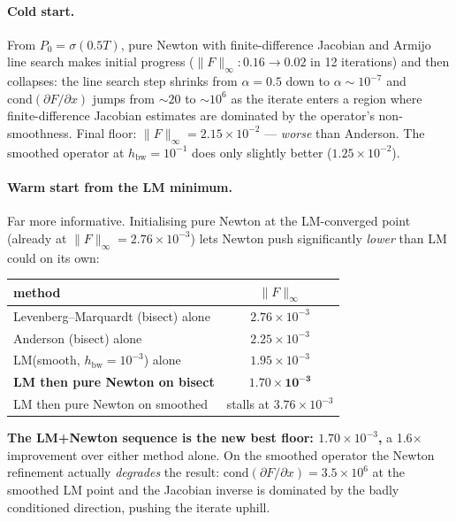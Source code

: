 \documentclass[11pt]{article}
\begin{document}
\paragraph{Cold start.} From $P_0 = \sigma(0.5 T)$, pure Newton with
finite-difference Jacobian and Armijo line search makes initial progress
($\|F\|_\infty\!:\! 0.16 \to 0.02$ in 12 iterations) and then collapses:
the line search step shrinks from $\alpha=0.5$ down to $\alpha\sim 10^{-7}$
and $\mathrm{cond}(\partial F/\partial x)$ jumps from $\sim 20$ to $\sim 10^6$
as the iterate enters a region where finite-difference Jacobian estimates
are dominated by the operator's non-smoothness. Final floor:
$\|F\|_\infty = 2.15\!\times\!10^{-2}$ --- \emph{worse} than Anderson.
The smoothed operator at $h_{\mathrm{bw}}=10^{-1}$ does only slightly
better ($1.25\!\times\!10^{-2}$).

\paragraph{Warm start from the LM minimum.} Far more informative.
Initialising pure Newton at the LM-converged point (already at
$\|F\|_\infty = 2.76\!\times\!10^{-3}$) lets Newton push significantly
\emph{lower} than LM could on its own:

\begin{center}
\begin{tabular}{lc}
\toprule
method & $\|F\|_\infty$ \\
\midrule
Levenberg--Marquardt (bisect) alone           & $2.76\!\times\!10^{-3}$ \\
Anderson (bisect) alone                       & $2.25\!\times\!10^{-3}$ \\
LM(smooth, $h_{\mathrm{bw}}{=}10^{-3}$) alone & $1.95\!\times\!10^{-3}$ \\
\textbf{LM then pure Newton on bisect}        & $\mathbf{1.70\!\times\!10^{-3}}$ \\
LM then pure Newton on smoothed               & stalls at $3.76\!\times\!10^{-3}$ \\
\bottomrule
\end{tabular}
\end{center}

\textbf{The LM+Newton sequence is the new best floor: $1.70\!\times\!10^{-3}$,}
a 1.6$\times$ improvement over either method alone. On the smoothed
operator the Newton refinement actually \emph{degrades} the result:
$\mathrm{cond}(\partial F / \partial x) = 3.5\!\times\!10^6$ at the
smoothed LM point and the Jacobian inverse is dominated by the badly
conditioned direction, pushing the iterate uphill.
\end{document}
